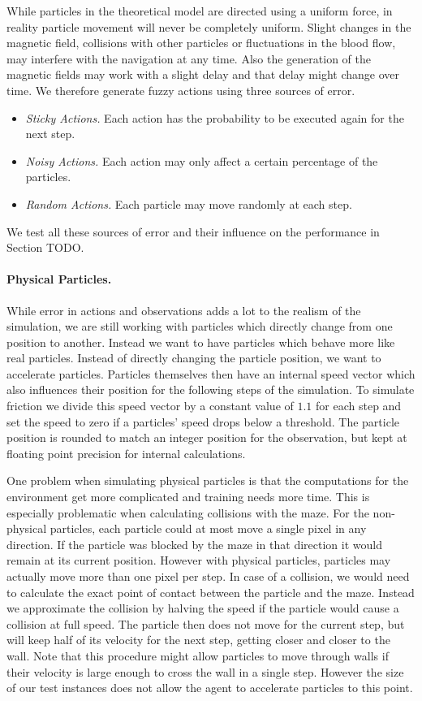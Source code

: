 While particles in the theoretical model are directed using a uniform force, in reality particle movement will never be completely uniform. Slight changes in the magnetic field, collisions with other particles or fluctuations in the blood flow, may interfere with the navigation at any time. Also the generation of the magnetic fields may work with a slight delay and that delay might change over time. We therefore generate fuzzy actions using three sources of error.

\begin{itemize}
    \item \textit{Sticky Actions.} Each action has the probability to be executed again for the next step.
    \item \textit{Noisy Actions.} Each action may only affect a certain percentage of the particles.
    \item \textit{Random Actions.} Each particle may move randomly at each step.
\end{itemize}

We test all these sources of error and their influence on the performance in Section TODO.

\paragraph{Physical Particles.}
While error in actions and observations adds a lot to the realism of the simulation, we are still working with particles which directly change from one position to another. Instead we want to have particles which behave more like real particles. Instead of directly changing the particle position, we want to accelerate particles. Particles themselves then have an internal speed vector which also influences their position for the following steps of the simulation. To simulate friction we divide this speed vector by a constant value of $1.1$ for each step and set the speed to zero if a particles' speed drops below a threshold. The particle position is rounded to match an integer position for the observation, but kept at floating point precision for internal calculations.

One problem when simulating physical particles is that the computations for the environment get more complicated and training needs more time. This is especially problematic when calculating collisions with the maze. For the non-physical particles, each particle could at most move a single pixel in any direction. If the particle was blocked by the maze in that direction it would remain at its current position. However with physical particles, particles may actually move more than one pixel per step. In case of a collision, we would need to calculate the exact point of contact between the particle and the maze. Instead we approximate the collision by halving the speed if the particle would cause a collision at full speed. The particle then does not move for the current step, but will keep half of its velocity for the next step, getting closer and closer to the wall. Note that this procedure might allow particles to move through walls if their velocity is large enough to cross the wall in a single step. However the size of our test instances does not allow the agent to accelerate particles to this point.

